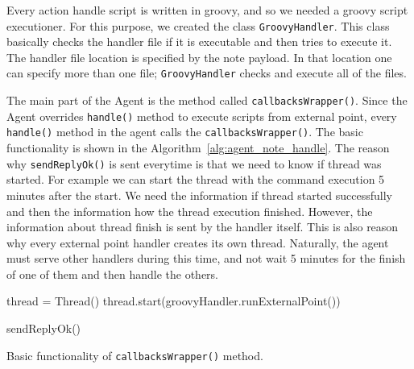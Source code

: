 Every action handle script is written in groovy, and so we needed a groovy script executioner. For this purpose, we created the class \texttt{GroovyHandler}. This class basically checks the handler file if it is executable and then tries to execute it. The handler file location is specified by the note payload. In that location one can specify more than one file; \texttt{GroovyHandler} checks and execute all of the files.

The main part of the Agent is the method called \texttt{callbacksWrapper()}. Since the Agent overrides \texttt{handle()} method to execute scripts from external point, every \texttt{handle()} method in the agent calls the \texttt{callbacksWrapper()}. The basic functionality is shown in the Algorithm~\ref{alg:agent_note_handle}. The reason why \texttt{sendReplyOk()} is sent everytime is that we need to know if thread was started. For example we can start the thread with the command execution 5 minutes after the start. We need the information if thread started successfully and then the information how the thread execution finished. However, the information about thread finish is sent by the handler itself. This is also reason why every external point handler creates its own thread. Naturally, the agent must serve other handlers during this time, and not wait 5 minutes for the finish of one of them and then handle the others.

\begin{center}
	\begin{algorithm}[H]
		\LinesNumbered
		\DontPrintSemicolon



		\var thread = Thread()\;
		thread.start(groovyHandler.runExternalPoint())\;

		sendReplyOk()\;

		 \caption{Basic functionality of \texttt{callbacksWrapper()} method. }
		 \label{alg:agent_note_handle}
	\end{algorithm}
\end{center}

